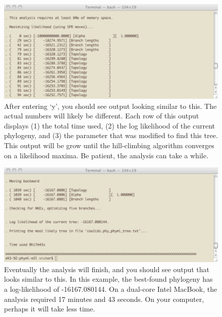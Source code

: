 \documentclass[11pt]{article}
\begin{document}
\begin{figure}[p]
\centering
\includegraphics[width=5.5 in]{GRAPHICS/a14.pdf}
\caption{After entering `y', you should see output looking similar to this.  The actual numbers will likely be different.  Each row of this output displays (1) the total time used, (2) the log likelihood of the current phylogeny, and (3) the parameter that was modified to find this tree.  This output will be grow until the hill-climbing algorithm converges on a likelihood maxima.  Be patient, the analysis can take a while.}
\end{figure}
\clearpage

\begin{figure}[p]
\centering
\includegraphics[width=5.5 in]{GRAPHICS/a15.pdf}
\caption{Eventually the analysis will finish, and you should see output that looks similar to this.  In this example, the best-found phylogeny has a log-likelihood of -16167.080144.  On a dual-core Intel MacBook, the analysis required 17 minutes and 43 seconds.  On your computer, perhaps it will take less time.}
\end{figure}
\clearpage
\end{document}
